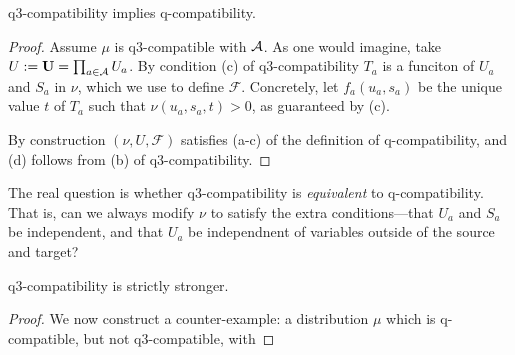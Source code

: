 \documentclass{article}
\begin{document}
\begin{prop}
    q3-compatibility implies q-compatibility.
\end{prop}
\begin{proof}
    Assume $\mu$ is q3-compatible with $\mathcal A$. 
    As one would imagine, take $U := \mathbf{U} = \prod_{a \in \mathcal A} U_a$. 
    By condition (c) of q3-compatibility $T_a$ is a funciton of $U_a$ and $S_a$ in $\nu$, which we use to define $\mathcal F$. Concretely, let $f_a(u_a, s_a)$ be the unique value $t$ of $T_a$ such that $\nu(u_a, s_a, t) > 0$, as guaranteed by (c).
    
    By construction $(\nu, U, \mathcal F)$ satisfies (a-c) of the definition of q-compatibility, and (d) follows from (b) of q3-compatibility. 
\end{proof}


The real question is whether q3-compatibility is \emph{equivalent} to q-compatibility. That is, can we always modify $\nu$ to satisfy the extra conditions---that $U_a$ and $S_a$ be independent, and that $U_a$ be independnent of variables outside of the source and target?

\begin{conj}
    q3-compatibility is strictly stronger.
\end{conj}
\begin{proof}
    We now construct a counter-example: a distribution $\mu$ which is q-compatible, but not q3-compatible, with 
    
    \TODO
\end{proof}


\end{document}

